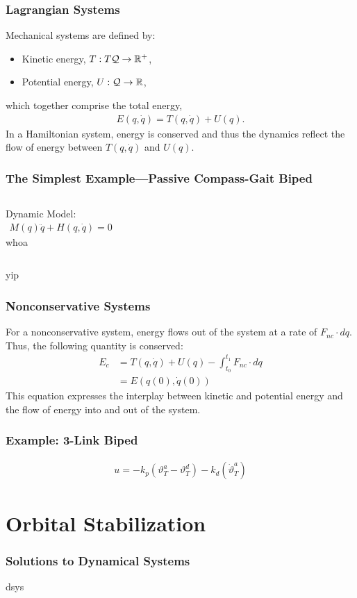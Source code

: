 \documentclass{beamer}
\newcommand{\sQ}{\mathcal{Q}}
\newcommand{\nc}{\mathit{nc}}
\begin{document}
\begin{frame}
  \frametitle{Lagrangian Systems}
  Mechanical systems are defined by:
  \begin{itemize}
  \item Kinetic energy, $T : T\sQ \to \R^+$,\\
  \item  Potential energy, $U : \sQ \to \R$,
  \end{itemize}
  which together comprise the total energy,
  \begin{align*}
    E(q, \dot q) = T(q, \dot q) + U(q).
  \end{align*}
  In a Hamiltonian system, energy is conserved and thus the dynamics reflect the flow of energy between $T(q, \dot q)$ and $U(q)$.
\end{frame}

\begin{frame}
  \frametitle{The Simplest Example---Passive Compass-Gait Biped}

  \begin{columns}[l]
    \column{1.5in}
    Dynamic Model:
    \begin{align*}
      M(q) \ddot q + H(q, \dot q) = 0
    \end{align*}
    \column{1.5in}
    whoa
  \end{columns}
  yip
\end{frame}

\begin{frame}
  \frametitle{Nonconservative Systems}
  For a nonconservative system, energy flows out of the system at a rate of $F_{\nc} \cdot dq$. Thus, the following quantity is conserved:
  \begin{align*}
    E_{c} &= T(q, \dot q) + U(q) - \int_{t_{0}}^{t_{1}} \! F_{\nc} \cdot dq\\
    &= E(q(0), \dot q(0))
  \end{align*}
  This equation expresses the interplay between kinetic and potential energy and the flow of energy into and out of the system.
\end{frame}

\begin{frame}
  \frametitle{Example: 3-Link Biped}
  \begin{align*}
    u = -k_{p} (\vartheta_{T}^{a} - \vartheta_{T}^{d}) - k_{d} (\dot \vartheta_{T}^{a})
  \end{align*}
\end{frame}

\section{Orbital Stabilization}
\begin{frame}
  \frametitle{Solutions to Dynamical Systems}
  dsys
\end{frame}
\end{document}
